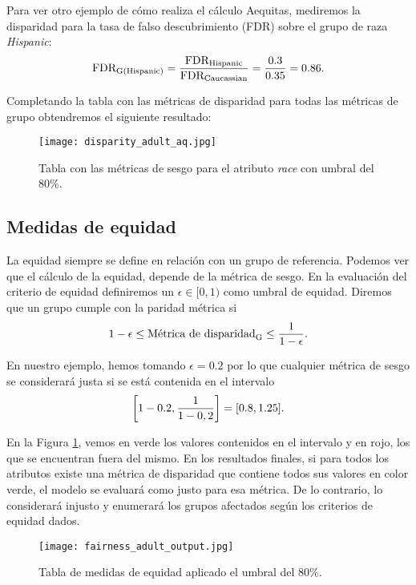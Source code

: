 Para ver otro ejemplo de cómo realiza el cálculo Aequitas, mediremos la disparidad para la tasa de falso descubrimiento (FDR) sobre el grupo de raza \textit{Hispanic}:
$$\text{FDR}_{\text{G(Hispanic)}}=\frac{\displaystyle \text{FDR}_{\text{Hispanic}}}{\displaystyle \text{FDR}_{\text{Caucassian}}}=\frac{\displaystyle 0.3}{\displaystyle 0.35}=0.86.$$

Completando la tabla con las métricas de disparidad para todas las métricas de grupo obtendremos el siguiente resultado:\\

\begin{figure}[h]
	\centering
	\texttt{[image: disparity\_adult\_aq.jpg]}
	\caption{Tabla con las métricas de sesgo para el atributo \textit{race} con umbral del 80\%.}
    \label{fig:ejaq2}
\end{figure}

\subsection*{Medidas de equidad}

La equidad siempre se define en relación con un grupo de referencia. Podemos ver que el cálculo de la equidad, depende de la métrica de sesgo. En la evaluación del criterio de equidad definiremos un $\epsilon \in [0,1)$ como umbral de equidad. Diremos que un grupo cumple con la paridad métrica si $$1-\epsilon\leq \text{\text{Métrica de disparidad}}_{\text{G}} \leq \frac{\displaystyle 1}{\displaystyle 1-\epsilon}.$$

En nuestro ejemplo, hemos tomando $\epsilon=0.2$ por lo que cualquier métrica de sesgo se considerará justa si se está contenida en el intervalo $$\left[1-0.2,\frac{\displaystyle 1}{\displaystyle 1-0,2}\right]=[0.8,1.25].$$

En la Figura \ref{fig:ejaq2}, vemos en verde los valores contenidos en el intervalo y en rojo, los que se encuentran fuera del mismo. En los resultados finales, si para todos los atributos existe una métrica de disparidad que contiene todos sus valores en color verde, el modelo se evaluará como justo para esa métrica. De lo contrario, lo considerará injusto y enumerará los grupos afectados según los criterios de equidad dados.\\

\begin{figure}[h]
	\centering
	\texttt{[image: fairness\_adult\_output.jpg]}
	\caption{Tabla de medidas de equidad aplicado el umbral del 80\%.}
    \label{fig:medequmbral}
\end{figure}

